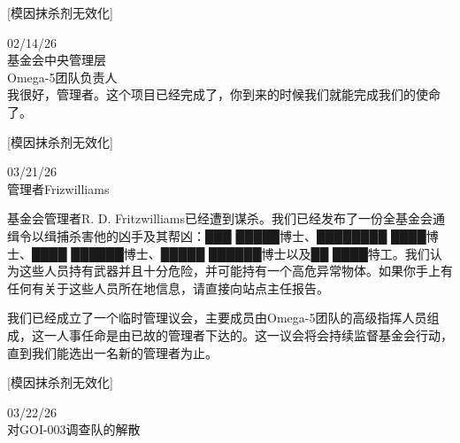 \begin{scpboxc}
{[模因抹杀剂无效化]}
\end{scpboxc}

02/14/26\\
基金会中央管理层\\
Omega-5团队负责人\\

我很好，管理者。这个项目已经完成了，你到来的时候我们就能完成我们的使命了。


\begin{scpboxc}
{[模因抹杀剂无效化]}
\end{scpboxc}

\begin{scpboxbbwm}


\Gg{[由监察者命令编辑]}


 03/21/26\\
管理者Frizwilliams

基金会管理者R. D. Fritzwilliams已经遭到谋杀。我们已经发布了一份全基金会通缉令以缉捕杀害他的凶手及其帮凶：███ █████博士、████████ ████博士、████ ██████博士、█████ ██████博士以及██ ████特工。我们认为这些人员持有武器并且十分危险，并可能持有一个高危异常物体。如果你手上有任何有关于这些人员所在地信息，请直接向站点主任报告。

我们已经成立了一个临时管理议会，主要成员由Omega-5团队的高级指挥人员组成，这一人事任命是由已故的管理者下达的。这一议会将会持续监督基金会行动，直到我们能选出一名新的管理者为止。

\end{scpboxbbwm}

\begin{scpboxc}
{[模因抹杀剂无效化]}
\end{scpboxc}

\begin{scpboxbbwm}



 03/22/26\\
对GOI-003调查队的解散








\end{scpboxbbwm}

